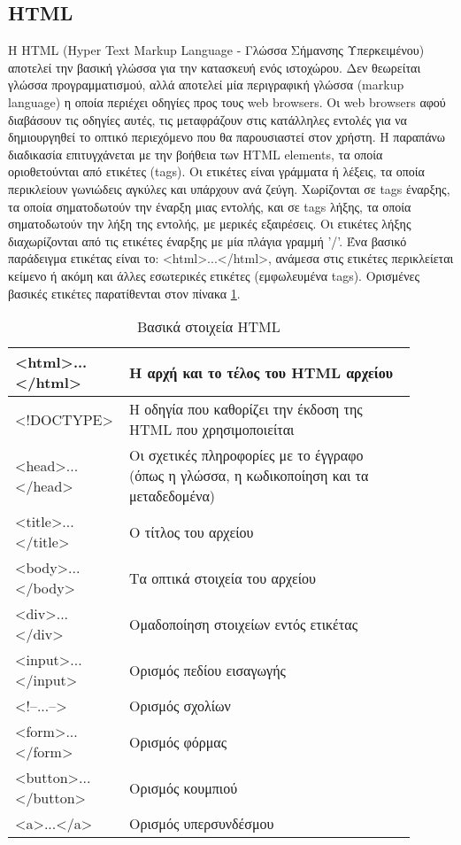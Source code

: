 \subsection{HTML}
Η HTML (Hyper Text Markup Language - Γλώσσα Σήμανσης Υπερκειμένου) αποτελεί την βασική γλώσσα για την κατασκευή ενός ιστοχώρου. Δεν θεωρείται γλώσσα προγραμματισμού, αλλά αποτελεί μία περιγραφική γλώσσα (markup language) η οποία περιέχει οδηγίες προς τους web browsers. Οι web browsers αφού διαβάσουν τις οδηγίες αυτές, τις μεταφράζουν στις κατάλληλες εντολές για να δημιουργηθεί το οπτικό περιεχόμενο που θα παρουσιαστεί στον χρήστη. Η παραπάνω διαδικασία επιτυγχάνεται με την βοήθεια των HTML elements, τα οποία οριοθετούνται από ετικέτες (tags). Οι ετικέτες είναι γράμματα ή λέξεις, τα οποία περικλείουν γωνιώδεις αγκύλες και υπάρχουν ανά ζεύγη. Χωρίζονται σε tags έναρξης, τα οποία σηματοδωτούν την έναρξη μιας εντολής, και σε tags λήξης, τα οποία σηματοδωτούν την λήξη της εντολής, με μερικές εξαιρέσεις. Οι ετικέτες λήξης διαχωρίζονται από τις ετικέτες έναρξης με μία πλάγια γραμμή '/'. Ένα βασικό παράδειγμα ετικέτας είναι το: <html>...</html>, ανάμεσα στις ετικέτες περικλείεται κείμενο ή ακόμη και άλλες εσωτερικές ετικέτες (εμφωλευμένα tags). Ορισμένες βασικές ετικέτες παρατίθενται στον πίνακα \ref{tbl:html_basic_elements}.

\begin{table}[h]
	\caption{Βασικά στοιχεία HTML}
	\label{tbl:html_basic_elements}
	\begin{tabular}{|p{0.2\linewidth}|p{0.7\linewidth}|}
		\hline
		\textless{}html\textgreater{}...\textless{}/html\textgreater{} & Η αρχή και το τέλος του HTML αρχείου \\ \hline
		\textless{}!DOCTYPE\textgreater{} & Η οδηγία που καθορίζει την έκδοση της HTML που χρησιμοποιείται \\ \hline
		\textless{}head\textgreater{}...\textless{}/head\textgreater{} & Οι σχετικές πληροφορίες με το έγγραφο (όπως η γλώσσα, η κωδικοποίηση και τα μεταδεδομένα) \\ \hline
		\textless{}title\textgreater{}...\textless{}/title\textgreater{} & Ο τίτλος του αρχείου \\ \hline
		\textless{}body\textgreater{}...\textless{}/body\textgreater{} & Τα οπτικά στοιχεία του αρχείου \\ \hline
		\textless{}div\textgreater{}...\textless{}/div\textgreater{} & Ομαδοποίηση στοιχείων εντός ετικέτας \\ \hline
		\textless{}input\textgreater{}...\textless{}/input\textgreater{} & Ορισμός πεδίου εισαγωγής \\ \hline
		\textless{}!--...--\textgreater{} & Ορισμός σχολίων \\ \hline
		\textless{}form\textgreater{}...\textless{}/form\textgreater{} & Ορισμός φόρμας \\ \hline
		\textless{}button\textgreater{}...\textless{}/button\textgreater{} & Ορισμός κουμπιού \\ \hline
		\textless{}a\textgreater{}...\textless{}/a\textgreater{} & Ορισμός υπερσυνδέσμου \\ \hline
	\end{tabular}
\end{table}

